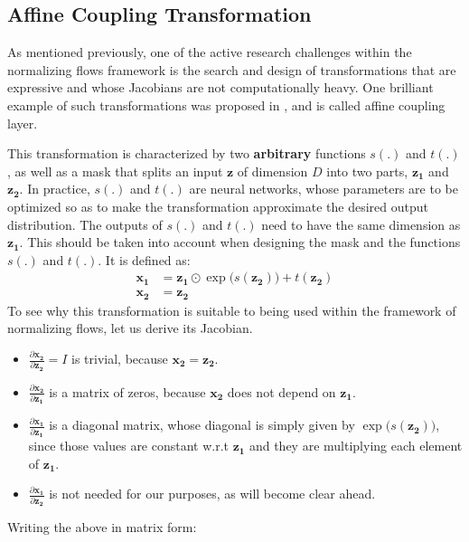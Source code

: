 \subsection{Affine Coupling Transformation}
As mentioned previously, one of the active research challenges within the
normalizing flows framework is the search and design of transformations that
are expressive and whose Jacobians are not computationally heavy. One brilliant
example of such transformations was proposed in \autocite{real-nvp}, and is
called affine coupling layer.

This transformation is characterized by two \textbf{arbitrary} functions $s(.)$ and
$t(.)$, as well as a mask that splits an input $\bm{z}$ of dimension $D$ into
two parts, $\bm{z_1}$ and $\bm{z_2}$. In practice, $s(.)$ and $t(.)$ are neural
networks, whose parameters are to be optimized so as to make the transformation
approximate the desired output distribution. The outputs of $s(.)$ and $t(.)$
need to have the same dimension as $\bm{z_1}$. This should be taken into account when
designing the mask and the functions $s(.)$ and $t(.)$. It is defined as:
\begin{align}
    \bm{x_1} &= \bm{z_1} \odot \exp\big(s(\bm{z_2})\big) + t(\bm{z_2}) \\
    \bm{x_2} &= \bm{z_2}
\end{align}
To see why this transformation is suitable to being used within the framework
of normalizing flows, let us derive its Jacobian.
\begin{itemize}
    \item $\frac{\partial \bm{x_2}}{\partial \bm{z_2}} = I$ is trivial, because $\bm{x_2} = \bm{z_2}$.
    \item $\frac{\partial \bm{x_2}}{\partial \bm{z_1}}$ is a matrix of zeros, because $\bm{x_2}$ does not depend on $\bm{z_1}$.
    \item $\frac{\partial \bm{x_1}}{\partial \bm{z_1}}$ is a diagonal matrix,
        whose diagonal is simply given by $\exp\big(s(\bm{z_2})\big)$, since those values are
        constant w.r.t $\bm{z_1}$ and they are multiplying each element of $\bm{z_1}$.
    \item $\frac{\partial \bm{x_1}}{\partial \bm{z_2}}$ is not needed for our purposes,
        as will become clear ahead.
\end{itemize}

Writing the above in matrix form:


